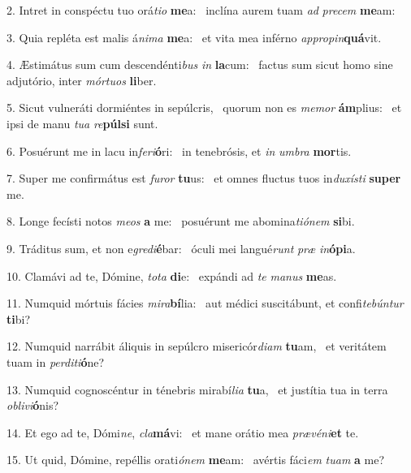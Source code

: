 2. Intret in conspéctu tuo orá\textit{ti}\textit{o} \textbf{me}a: \ast\  inclína aurem tuam \textit{ad} \textit{pre}\textit{cem} \textbf{me}am:\

3. Quia repléta est malis á\textit{ni}\textit{ma} \textbf{me}a: \ast\  et vita mea inférno \textit{ap}\textit{pro}\textit{pin}\textbf{quá}vit.\

4. Æstimátus sum cum descendénti\textit{bus} \textit{in} \textbf{la}cum: \ast\  factus sum sicut homo sine adjutório, inter \textit{mór}\textit{tu}\textit{os} \textbf{li}ber.\

5. Sicut vulneráti dormiéntes in sepúlcris, \dag\  quorum non es \textit{me}\textit{mor} \textbf{ám}plius: \ast\  et ipsi de manu \textit{tu}\textit{a} \textit{re}\textbf{púl}\textbf{si} sunt.\

6. Posuérunt me in lacu in\textit{fe}\textit{ri}\textbf{ó}ri: \ast\  in tenebrósis, et \textit{in} \textit{um}\textit{bra} \textbf{mor}tis.\

7. Super me confirmátus est \textit{fu}\textit{ror} \textbf{tu}us: \ast\  et omnes fluctus tuos in\textit{du}\textit{xís}\textit{ti} \textbf{su}\textbf{per} me.\

8. Longe fecísti notos \textit{me}\textit{os} \textbf{a} me: \ast\  posuérunt me abomina\textit{ti}\textit{ó}\textit{nem} \textbf{si}bi.\

9. Tráditus sum, et non e\textit{gre}\textit{di}\textbf{é}bar: \ast\  óculi mei langué\textit{runt} \textit{præ} \textit{in}\textbf{ó}\textbf{pi}a.\

10. Clamávi ad te, Dómine, \textit{to}\textit{ta} \textbf{di}e: \ast\  expándi ad \textit{te} \textit{ma}\textit{nus} \textbf{me}as.\

11. Numquid mórtuis fácies \textit{mi}\textit{ra}\textbf{bí}lia: \ast\  aut médici suscitábunt, et confi\textit{te}\textit{bún}\textit{tur} \textbf{ti}bi?\

12. Numquid narrábit áliquis in sepúlcro misericór\textit{di}\textit{am} \textbf{tu}am, \ast\  et veritátem tuam in \textit{per}\textit{di}\textit{ti}\textbf{ó}ne?\

13. Numquid cognoscéntur in ténebris mirabí\textit{li}\textit{a} \textbf{tu}a, \ast\  et justítia tua in terra \textit{ob}\textit{li}\textit{vi}\textbf{ó}nis?\

14. Et ego ad te, Dómi\textit{ne}, \textit{cla}\textbf{má}vi: \ast\  et mane orátio mea \textit{præ}\textit{vé}\textit{ni}\textbf{et} te.\

15. Ut quid, Dómine, repéllis orati\textit{ó}\textit{nem} \textbf{me}am: \ast\  avértis fáci\textit{em} \textit{tu}\textit{am} \textbf{a} me?\

